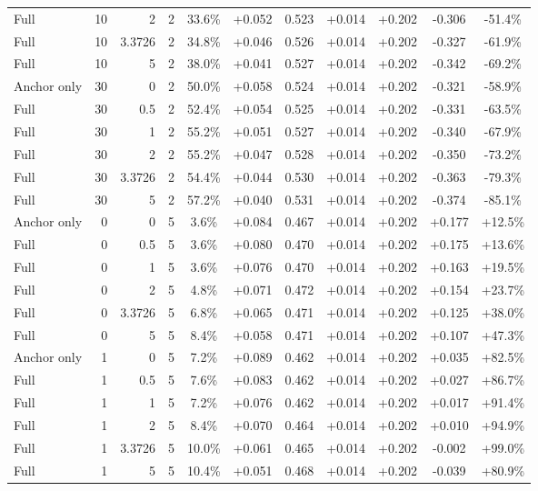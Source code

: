 \begin{table}[htbp]
\begin{tabular}{lrrrccccccc}
Full & 10 & 2 & 2 & 33.6\% & +0.052 & 0.523 & +0.014 & +0.202 & -0.306 & -51.4\% \\
Full & 10 & 3.3726 & 2 & 34.8\% & +0.046 & 0.526 & +0.014 & +0.202 & -0.327 & -61.9\% \\
Full & 10 & 5 & 2 & 38.0\% & +0.041 & 0.527 & +0.014 & +0.202 & -0.342 & -69.2\% \\
Anchor only & 30 & 0 & 2 & 50.0\% & +0.058 & 0.524 & +0.014 & +0.202 & -0.321 & -58.9\% \\
Full & 30 & 0.5 & 2 & 52.4\% & +0.054 & 0.525 & +0.014 & +0.202 & -0.331 & -63.5\% \\
Full & 30 & 1 & 2 & 55.2\% & +0.051 & 0.527 & +0.014 & +0.202 & -0.340 & -67.9\% \\
Full & 30 & 2 & 2 & 55.2\% & +0.047 & 0.528 & +0.014 & +0.202 & -0.350 & -73.2\% \\
Full & 30 & 3.3726 & 2 & 54.4\% & +0.044 & 0.530 & +0.014 & +0.202 & -0.363 & -79.3\% \\
Full & 30 & 5 & 2 & 57.2\% & +0.040 & 0.531 & +0.014 & +0.202 & -0.374 & -85.1\% \\
Anchor only & 0 & 0 & 5 & 3.6\% & +0.084 & 0.467 & +0.014 & +0.202 & +0.177 & +12.5\% \\
Full & 0 & 0.5 & 5 & 3.6\% & +0.080 & 0.470 & +0.014 & +0.202 & +0.175 & +13.6\% \\
Full & 0 & 1 & 5 & 3.6\% & +0.076 & 0.470 & +0.014 & +0.202 & +0.163 & +19.5\% \\
Full & 0 & 2 & 5 & 4.8\% & +0.071 & 0.472 & +0.014 & +0.202 & +0.154 & +23.7\% \\
Full & 0 & 3.3726 & 5 & 6.8\% & +0.065 & 0.471 & +0.014 & +0.202 & +0.125 & +38.0\% \\
Full & 0 & 5 & 5 & 8.4\% & +0.058 & 0.471 & +0.014 & +0.202 & +0.107 & +47.3\% \\
Anchor only & 1 & 0 & 5 & 7.2\% & +0.089 & 0.462 & +0.014 & +0.202 & +0.035 & +82.5\% \\
Full & 1 & 0.5 & 5 & 7.6\% & +0.083 & 0.462 & +0.014 & +0.202 & +0.027 & +86.7\% \\
Full & 1 & 1 & 5 & 7.2\% & +0.076 & 0.462 & +0.014 & +0.202 & +0.017 & +91.4\% \\
Full & 1 & 2 & 5 & 8.4\% & +0.070 & 0.464 & +0.014 & +0.202 & +0.010 & +94.9\% \\
Full & 1 & 3.3726 & 5 & 10.0\% & +0.061 & 0.465 & +0.014 & +0.202 & -0.002 & +99.0\% \\
Full & 1 & 5 & 5 & 10.4\% & +0.051 & 0.468 & +0.014 & +0.202 & -0.039 & +80.9\% \\

\end{tabular}
\end{table}
